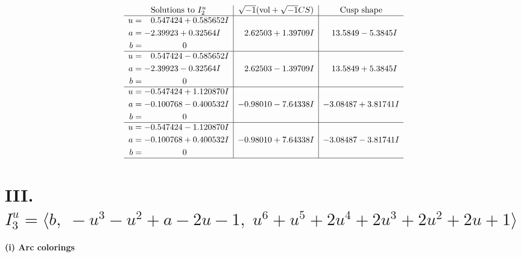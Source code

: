 \documentclass[1p]{elsarticle_modified}
\theoremstyle{definition}
\newcommand{\I}{\sqrt{-1}}
\begin{document}
$$\begin{array}{c|c|c}  
\text{Solutions to }I^u_{2}& \I (\text{vol} + \sqrt{-1}CS) & \text{Cusp shape}\\
 \hline 
\begin{aligned}
u &= \phantom{-}0.547424 + 0.585652 I \\
a &= -2.39923 + 0.32564 I \\
b &= \phantom{-0.000000 } 0\end{aligned}
 & \phantom{-}2.62503 + 1.39709 I & \phantom{-}13.5849 - 5.3845 I \\ \hline\begin{aligned}
u &= \phantom{-}0.547424 - 0.585652 I \\
a &= -2.39923 - 0.32564 I \\
b &= \phantom{-0.000000 } 0\end{aligned}
 & \phantom{-}2.62503 - 1.39709 I & \phantom{-}13.5849 + 5.3845 I \\ \hline\begin{aligned}
u &= -0.547424 + 1.120870 I \\
a &= -0.100768 - 0.400532 I \\
b &= \phantom{-0.000000 } 0\end{aligned}
 & -0.98010 - 7.64338 I & -3.08487 + 3.81741 I \\ \hline\begin{aligned}
u &= -0.547424 - 1.120870 I \\
a &= -0.100768 + 0.400532 I \\
b &= \phantom{-0.000000 } 0\end{aligned}
 & -0.98010 + 7.64338 I & -3.08487 - 3.81741 I\\
 \hline 
 \end{array}$$\newpage\newpage\renewcommand{\arraystretch}{1}
\centering \section*{III. $I^u_{3}= \langle b,\;- u^3- u^2+a-2 u-1,\;u^6+u^5+2 u^4+2 u^3+2 u^2+2 u+1 \rangle$}
\flushleft \textbf{(i) Arc colorings}\\
\end{document}
